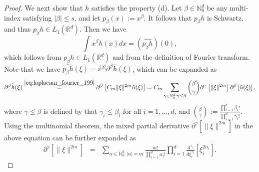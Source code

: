 \documentclass[11pt]{article}
\theoremstyle{remark}
\theoremstyle{example}
\theoremstyle{remark}
\newcommand{\N}{\mathbb{N}}
\newcommand{\R}{\mathbb{R}}
\newcommand{\citealp}{\cite}
\begin{document}
\begin{proof}
We next show that $h$ satisfies the property (d).
Let $\beta \in \N_0^d$ be any multi-index satisfying $| \beta | \leq s$, and let $p_\beta (x) := x^\beta$. %
It follows that $p_\beta h$ is Schwartz, and thus $p_\beta h \in L_1(\R^d)$.
Then  we have 
\begin{equation} \label{eq:integral_mono_211}
\int x^\beta h(x) dx = (\widehat{p_\beta h})(0),
\end{equation}
which follows from $p_\beta h \in L_1(\R^d)$ and from the definition of Fourier transform.
Note that we have $\widehat{p_\beta h}(\xi) = i^{| \beta |} \partial^{ \beta } \hat{h} (\xi)$, which can be expanded as
\begin{equation}
 \partial^{ \beta } \hat{h} (\xi)
\stackrel{\eqref{eq:laplacian_fourier_199}}{=}  \partial^\beta \left[ C_m \| \xi \|^{2m} \hat{u}(\xi) \right]
= C_m  \sum_{\gamma \in \N_0^d: \gamma \leq \beta} \binom{\beta}{\gamma} \partial^\gamma \left[\| \xi \|^{2m} \right] \partial^\beta \left[ \hat{u}(\xi) \right], \label{eq:mixed_partial_223}
\end{equation}
where $\gamma \leq \beta$ is defined by that $\gamma_i \leq \beta_i$ for all $i=1,\dots,d$, and $\binom{\beta}{\gamma} := \frac{ \prod_{i=1}^d \beta_i ! }{ \prod_{i=1}^d \gamma_i! }$. %
Using the multinomial theorem, the mixed partial derivative $\partial^\gamma \left[\| \xi \|^{2m} \right]$ in the above equation can be further expanded as
\begin{eqnarray} 
\partial^\gamma \left[\| \xi \|^{2m} \right] 
&=& \sum_{\alpha \in \N_0^d: | \alpha | = m} \frac{m!}{ \prod_{i=1}^d \alpha_i ! } \prod_{i=1}^d \frac{d^{ \gamma_i }}{d \xi_i^{\gamma_i}} \left[ \xi_i^{2 \alpha_i} \right] . \label{eq:multinomial_231}
\end{eqnarray}
\begin{comment}
Note that we have
\[
\frac{d^{ \gamma_i }}{d \xi_i^{\gamma_i}} \left[ \xi_i^{2 \alpha_i} \right] = 
\begin{cases} 

\end{comment}
\end{proof}
\end{document}
